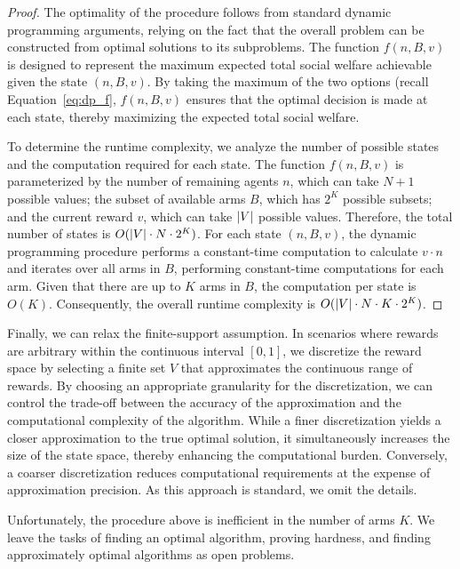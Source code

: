 \begin{proof}
    The optimality of the procedure follows from standard dynamic programming arguments, relying on the fact that the overall problem can be constructed from optimal solutions to its subproblems. The function $f(n, B, v)$ is designed to represent the maximum expected total social welfare achievable given the state $(n, B, v)$. By taking the maximum of the two options (recall Equation~\eqref{eq:dp_f}, $f(n, B, v)$ ensures that the optimal decision is made at each state, thereby maximizing the expected total social welfare.

To determine the runtime complexity, we analyze the number of possible states and the computation required for each state. The function $f(n, B, v)$ is parameterized by the number of remaining agents $n$, which can take $N+1$ possible values; the subset of available arms $B$, which has $2^K$ possible subsets; and the current reward $v$, which can take $\left\lvert V\right\rvert$ possible values. Therefore, the total number of states is $O(\left\lvert V\right\rvert \cdot N \cdot 2^K)$. For each state $(n, B, v)$, the dynamic programming procedure performs a constant-time computation to calculate $v \cdot n$ and iterates over all arms in $B$, performing constant-time computations for each arm. Given that there are up to $K$ arms in $B$, the computation per state is $O(K)$. Consequently, the overall runtime complexity is $O(\left\lvert V\right\rvert \cdot N \cdot K \cdot 2^K )$. 
\end{proof}


Finally, we can relax the finite-support assumption. In scenarios where rewards are arbitrary within the continuous interval $[0,1]$, we discretize the reward space by selecting a finite set $V$ that approximates the continuous range of rewards. By choosing an appropriate granularity for the discretization, we can control the trade-off between the accuracy of the approximation and the computational complexity of the algorithm. While a finer discretization yields a closer approximation to the true optimal solution, it simultaneously increases the size of the state space, thereby enhancing the computational burden. Conversely, a coarser discretization reduces computational requirements at the expense of approximation precision. As this approach is standard, we omit the details. 


Unfortunately, the procedure above is inefficient in the number of arms $K$. We leave the tasks of finding an optimal algorithm, proving hardness, and finding approximately optimal algorithms as open problems.
